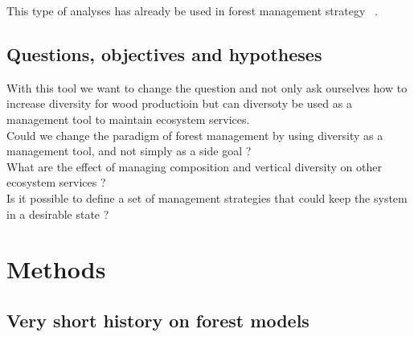 \documentclass{article}
\begin{document}
This type of analyses has already be used in forest management strategy ~\autocite{mathiasUsingViabilityTheory2015}.

\subsection{Questions, objectives and hypotheses}

With this tool we want to change the question and not only ask ourselves how to increase diversity for wood productioin but can diversoty be used as a management tool to maintain ecosystem services.\\
Could we change the paradigm of forest management by using diversity as a management tool, and not simply as a side goal ?\\
What are the effect of managing composition and vertical diversity on other ecosystem services ?\\
Is it possible to define a set of management strategies that could keep the system in a desirable state ?\\

\section{Methods}

\subsection{Very short history on forest models}
\end{document}
